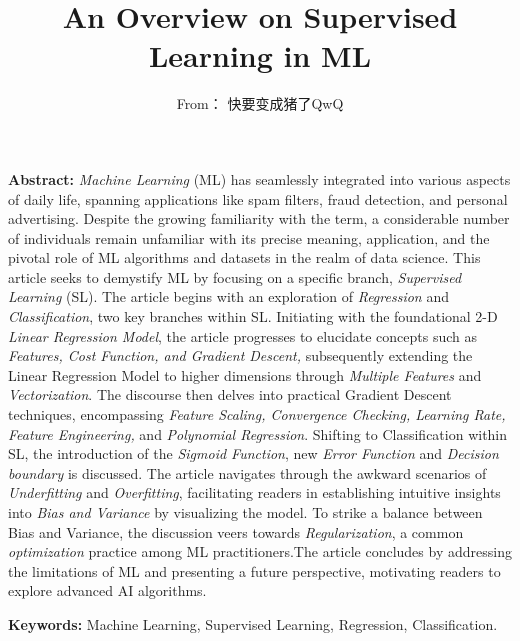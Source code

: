 \documentclass[12pt, twoside]{article}
\title{\textbf{An Overview on Supervised Learning in ML}}
\author{From： 快要变成猪了QwQ}
\date{}
\begin{document}
	
\maketitle

\noindent\textbf{Abstract: }\textit{Machine Learning} (ML) has seamlessly integrated into various aspects of daily life, spanning applications like spam filters, fraud detection, and personal advertising. Despite the growing familiarity with the term, a considerable number of individuals remain unfamiliar with its precise meaning, application, and the pivotal role of ML algorithms and datasets in the realm of data science. This article seeks to demystify ML by focusing on a specific branch, \textit{Supervised Learning} (SL). The article begins with an exploration of \textit{Regression} and \textit{Classification}, two key branches within SL. Initiating with the foundational 2-D \textit{Linear Regression Model}, the article progresses to elucidate concepts such as \textit{Features, Cost Function, and Gradient Descent,} subsequently extending the Linear Regression Model to higher dimensions through \textit{Multiple Features} and \textit{Vectorization}. The discourse then delves into practical Gradient Descent techniques, encompassing \textit{Feature Scaling, Convergence Checking, Learning Rate, Feature Engineering,} and \textit{Polynomial Regression}. Shifting to Classification within SL, the introduction of the \textit{Sigmoid Function}, new \textit{Error Function} and \textit{Decision boundary} is discussed. The article navigates through the awkward scenarios of \textit{Underfitting} and \textit{Overfitting}, facilitating readers in establishing intuitive insights into \textit{Bias and Variance} by visualizing the model. To strike a balance between Bias and Variance, the discussion veers towards \textit{Regularization}, a common \textit{optimization} practice among ML practitioners.The article concludes by addressing the limitations of ML and presenting a future perspective, motivating readers to explore advanced AI algorithms.
\vspace{20pt}

\noindent\textbf{Keywords: }Machine Learning, Supervised Learning, Regression, Classification.
\vspace{20pt}
\end{document}
